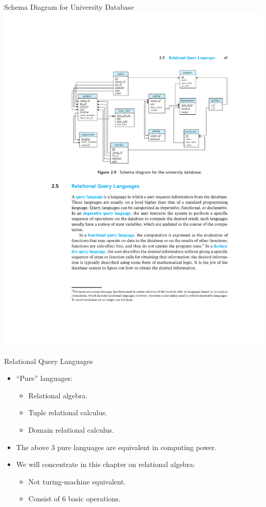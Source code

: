 \documentclass{beamer}
\begin{document}
\begin{frame}{Schema Diagram for University Database}
    \centering
    \includegraphics[width=\textwidth, trim={5.50cm 15.30cm 2.90cm 4.85cm}, clip]{figures/db_schema}
\end{frame}

\begin{frame}{Relational Query Languages}
    \begin{itemize}
        \item ``Pure'' languages:
        \begin{itemize}
            \item Relational algebra.
            \item Tuple relational calculus.
            \item Domain relational calculus.
        \end{itemize}
        \item The above 3 pure languages are equivalent in computing power.
        \item We will concentrate in this chapter on relational algebra:
        \begin{itemize}
            \item Not turing-machine equivalent.
            \item Consist of 6 basic operations.
        \end{itemize}
    \end{itemize}
\end{frame}
\end{document}

